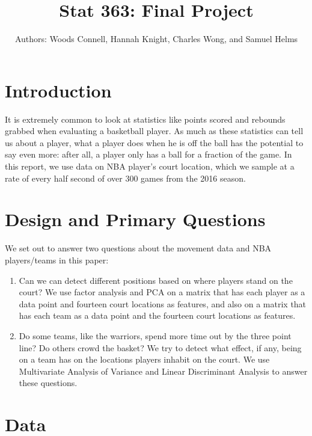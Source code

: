 \documentclass[]{article}
\title{Stat 363: Final Project}
\author{Authors: Woods Connell, Hannah Knight, Charles Wong, and Samuel Helms}
\date{}
\begin{document}
\maketitle

{
\setcounter{tocdepth}{3}
\tableofcontents
}
\hypertarget{introduction}{%
\section{Introduction}\label{introduction}}

It is extremely common to look at statistics like points scored and
rebounds grabbed when evaluating a basketball player. As much as these
statistics can tell us about a player, what a player does when he is off
the ball has the potential to say even more: after all, a player only
has a ball for a fraction of the game. In this report, we use data on
NBA player's court location, which we sample at a rate of every half
second of over 300 games from the 2016 season.

\hypertarget{design-and-primary-questions}{%
\section{Design and Primary
Questions}\label{design-and-primary-questions}}

We set out to answer two questions about the movement data and NBA
players/teams in this paper:

\begin{enumerate}
\def\labelenumi{\arabic{enumi}.}
\item
  Can we can detect different positions based on where players stand on
  the court? We use factor analysis and PCA on a matrix that has each
  player as a data point and fourteen court locations as features, and
  also on a matrix that has each team as a data point and the fourteen
  court locations as features.
\item
  Do some teams, like the warriors, spend more time out by the three
  point line? Do others crowd the basket? We try to detect what effect,
  if any, being on a team has on the locations players inhabit on the
  court. We use Multivariate Analysis of Variance and Linear
  Discriminant Analysis to answer these questions.
\end{enumerate}

\hypertarget{data}{%
\section{Data}\label{data}}
\end{document}
